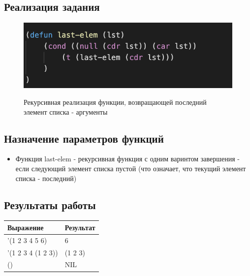 \documentclass[a4paper,12pt]{article}
\begin{document}
 	\subsection*{Реализация задания}
 	
 	\begin{figure}[h!]
 		\begin{center}
 			{\includegraphics[scale = 1.0]{6.11.png}}
 			\label{ris:6.11}
 		\end{center}
 	\caption{Рекурсивная реализация функции, возвращающей последний элемент списка - аргументы}
 	\end{figure}
 	
 	\subsection*{Назначение параметров функций}
 	
 	\begin{itemize}
 		\item Функция last-elem - рекурсивная функция с одним варинтом завершения - если следующий элемент списка пустой (что означает, что текущий элемент списка - последний)
 	\end{itemize}
 	
 	\subsection*{Результаты работы}
 	
 	 \begin{table} [h!]
 		\begin{center}
 			\begin{tabular}{|l|l|}
 				\hline
 				{\bf  Выражение} & {\bf Результат} \\
 				\hline
 				{'(1 2 3 4 5 6)} & 6\\
 				\hline
 				{'(1 2 3 4 (1 2 3))} & (1 2 3)\\
 				\hline
 				{()} & NIL\\
 				\hline
 			\end{tabular}  
 			\label{m2}
 		\end{center}
 	\end{table}
 	
\end{document}
